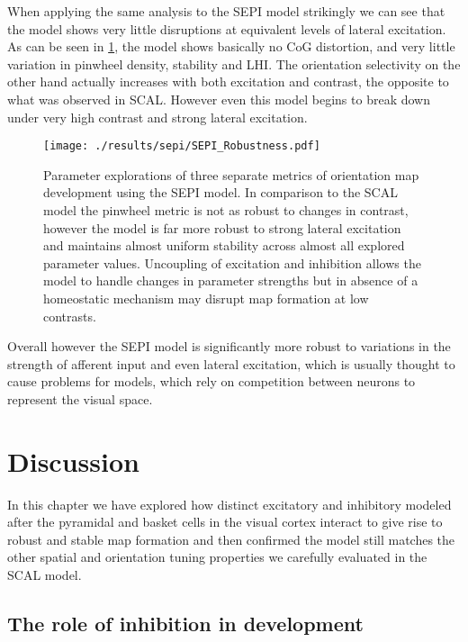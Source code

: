 When applying the same analysis to the SEPI model strikingly we can
see that the model shows very little disruptions at equivalent levels
of lateral excitation. As can be seen in \ref{SEPIStability}, the
model shows basically no CoG distortion, and very little variation in
pinwheel density, stability and LHI. The orientation selectivity on
the other hand actually increases with both excitation and contrast,
the opposite to what was observed in SCAL. However even this model
begins to break down under very high contrast and strong lateral
excitation.

\begin{figure}
	\centering
        \texttt{[image: ./results/sepi/SEPI\_Robustness.pdf]}
	\caption{Parameter explorations of three separate metrics of
          orientation map development using the SEPI model. In
          comparison to the SCAL model the pinwheel metric is not as
          robust to changes in contrast, however the model is far more
          robust to strong lateral excitation and maintains almost
          uniform stability across almost all explored parameter
          values. Uncoupling of excitation and inhibition allows the
          model to handle changes in parameter strengths but in
          absence of a homeostatic mechanism may disrupt map formation
          at low contrasts.}
	\label{SEPIStability}
\end{figure}

Overall however the SEPI model is significantly more robust to
variations in the strength of afferent input and even lateral
excitation, which is usually thought to cause problems for models,
which rely on competition between neurons to represent the visual
space.

\section{Discussion}

In this chapter we have explored how distinct excitatory and
inhibitory modeled after the pyramidal and basket cells in the visual
cortex interact to give rise to robust and stable map formation and
then confirmed the model still matches the other spatial and
orientation tuning properties we carefully evaluated in the SCAL
model.

\subsection{The role of inhibition in development}

